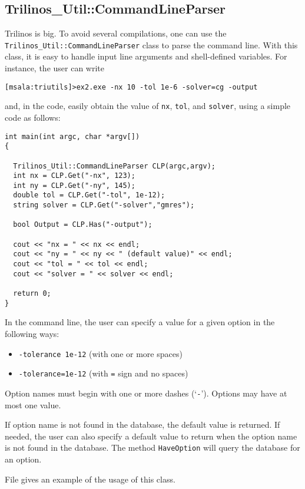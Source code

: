 
\subsection{Trilinos\_Util::CommandLineParser}
\label{sec:triutils:CLP}

Trilinos is big. To avoid several compilations, one can use the \newline
\verb!Trilinos_Util::CommandLineParser! class to parse the command line.
With this class, it is easy to handle input line arguments and
shell-defined variables. For instance, the user can write
\begin{verbatim}
[msala:triutils]>ex2.exe -nx 10 -tol 1e-6 -solver=cg -output
\end{verbatim}
and, in the code, easily obtain the value of {\tt nx}, {\tt tol}, and
{\tt solver}, using a simple code as follows:
\begin{verbatim}
int main(int argc, char *argv[])
{

  Trilinos_Util::CommandLineParser CLP(argc,argv);
  int nx = CLP.Get("-nx", 123);
  int ny = CLP.Get("-ny", 145);
  double tol = CLP.Get("-tol", 1e-12);
  string solver = CLP.Get("-solver","gmres");

  bool Output = CLP.Has("-output");

  cout << "nx = " << nx << endl;
  cout << "ny = " << ny << " (default value)" << endl;
  cout << "tol = " << tol << endl;
  cout << "solver = " << solver << endl;

  return 0;
}
\end{verbatim}
In the command line, the user can specify a value for a given option in
the following ways:
\begin{itemize}
\item \verb!-tolerance 1e-12! (with one or more spaces)
\item \verb!-tolerance=1e-12! (with \verb!=! sign and no spaces)
\end{itemize}

Option names must begin with one or more dashes (`\verb!-!'). Options
may have at most one value.
 
If option name is not found in the database, the default value is
returned. If needed, the user can also specify a default value to return
when the option name is not found in the database. The method
\verb!HaveOption! will query the database for an option.

File  gives an example of the usage of this class.
 
